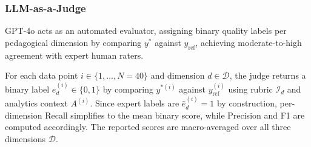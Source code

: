 \documentclass[conference,a4paper]{IEEEtran}
\begin{document}

\subsubsection{LLM-as-a-Judge}


GPT-4o \cite{koutcheme2024openfeedback} acts as an
automated evaluator, assigning binary quality labels
per pedagogical dimension by comparing $y^*$ against
$y_{\text{ref}}$, achieving moderate-to-high agreement
with expert human raters.


For each data point $i \in \{1,\dots,N{=}40\}$ and
dimension $d \in \mathcal{D}$, the judge returns
a binary label $e^{(i)}_d \in \{0,1\}$ by comparing
$y^{*(i)}$ against $y^{(i)}_{\text{ref}}$ using
rubric $\mathcal{I}_d$ and analytics context
$A^{(i)}$. Since expert labels are $\hat{e}^{(i)}_d=1$
by construction, per-dimension Recall simplifies to
the mean binary score, while Precision and F1 are computed
accordingly. The reported scores are macro-averaged
over all three dimensions $\mathcal{D}$.
\end{document}
